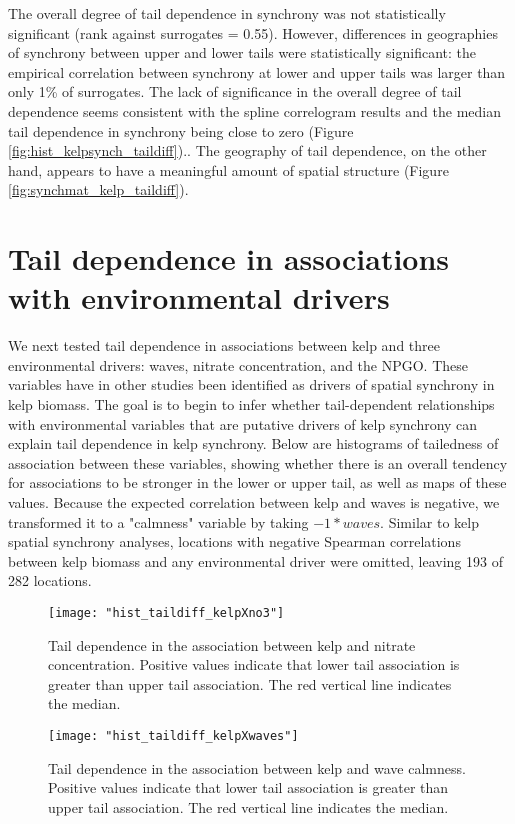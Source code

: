 \documentclass[12pt, oneside]{article}
\begin{document}
The overall degree of tail dependence in synchrony was not statistically significant (rank against surrogates = 0.55).
However, differences in geographies of synchrony between upper and lower tails were statistically significant: the empirical correlation between synchrony at lower and upper tails was larger than only 1\% of surrogates.
The lack of significance in the overall degree of tail dependence seems consistent with the spline correlogram results and the median tail dependence in synchrony being close to zero  (Figure \ref{fig:hist_kelpsynch_taildiff})..
The geography of tail dependence, on the other hand, appears to have a meaningful amount of spatial structure (Figure \ref{fig:synchmat_kelp_taildiff}).


\section{Tail dependence in associations with environmental drivers}

We next tested tail dependence in associations between kelp and three environmental drivers: waves, nitrate concentration, and the NPGO.
These variables have in other studies been identified as drivers of spatial synchrony in kelp biomass.
The goal is to begin to infer whether tail-dependent relationships with environmental variables that are putative drivers of kelp synchrony can explain tail dependence in kelp synchrony.
Below are histograms of tailedness of association between these variables, showing whether there is an overall tendency for associations to be stronger in the lower or upper tail, as well as maps of these values.
Because the expected correlation between kelp and waves is negative, we transformed it to a "calmness" variable by taking $-1*waves$.
Similar to kelp spatial synchrony analyses, locations with negative Spearman correlations between kelp biomass and any environmental driver were omitted, leaving 193 of 282 locations.

\begin{figure}
    \centering
    \texttt{[image: "hist\_taildiff\_kelpXno3"]}
    \caption{Tail dependence in the association between kelp and nitrate concentration. Positive values indicate that lower tail association is greater than upper tail association.
     The red vertical line indicates the median.}
    \label{fig:hist_taildiff_kelpXno3}
\end{figure}

\begin{figure}
    \centering
    \texttt{[image: "hist\_taildiff\_kelpXwaves"]}
    \caption{Tail dependence in the association between kelp and wave calmness. Positive values indicate that lower tail association is greater than upper tail association.
     The red vertical line indicates the median.}
    \label{fig:hist_taildiff_kelpXwaves}
\end{figure}
\end{document}
